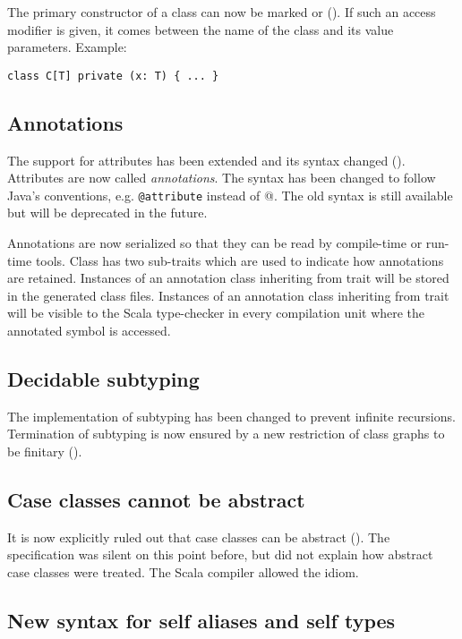 The primary constructor of a class can now be marked  or
 (). If such an access modifier is given, it comes
between the name of the class and its value parameters. Example:
\begin{lstlisting}
class C[T] private (x: T) { ... }
\end{lstlisting}

\subsection*{Annotations}

The support for attributes has been extended and its syntax changed
().  Attributes are now called {\em
  annotations}. The syntax has been changed to follow Java's
conventions, e.g. \lstinline^@attribute^ instead of
\lstinline@[attribute]@. The old syntax is still available but will be
deprecated in the future.

Annotations are now serialized so that they can be read by
compile-time or run-time tools. Class  has two
sub-traits which are used to indicate how annotations are
retained. Instances of an annotation class inheriting from trait
 will be stored in the generated class
files. Instances of an annotation class inheriting from trait
 will be visible to the Scala type-checker
in every compilation unit where the annotated symbol is accessed. 

\subsection*{Decidable subtyping}

The implementation of subtyping has been changed to prevent infinite
recursions. Termination of subtyping is now ensured by a new
restriction of class graphs to be finitary
().

\subsection*{Case classes cannot be abstract}

It is now explicitly ruled out that case classes can be abstract
(). The specification was silent on this point
before, but did not explain how abstract case classes were
treated. The Scala compiler allowed the idiom.

\subsection*{New syntax for self aliases and self types}

